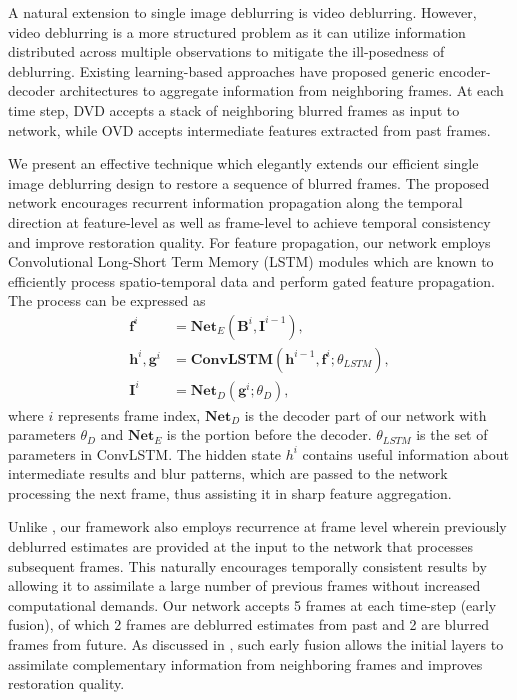 \documentclass[10pt,twocolumn,letterpaper]{article}
\begin{document}
A natural extension to single image deblurring is video deblurring. However, video deblurring is a more structured problem as it can utilize information distributed across multiple observations to mitigate the ill-posedness of deblurring. Existing learning-based approaches \cite{su2017deep,hyun2017online} have proposed generic encoder-decoder architectures to aggregate information from neighboring frames. At each time step, DVD \cite{su2017deep} accepts a stack of neighboring blurred frames as input to network, while OVD \cite{hyun2017online} accepts intermediate features extracted from past frames.
 
We present an effective technique which elegantly extends our efficient single image deblurring design to restore a sequence of blurred frames. The proposed network encourages recurrent information propagation along the temporal direction  at feature-level as well as frame-level to achieve temporal consistency and improve restoration quality. For feature propagation, our network employs Convolutional Long-Short Term Memory (LSTM) modules \cite{xingjian2015convolutional} which are known to efficiently process spatio-temporal data and perform gated feature propagation. The process can be expressed as
\begin{equation}
   \begin{aligned}
      \mathbf{f}^i &= \mathbf{Net}_{E}(\mathbf{B}^i,\mathbf{I}^{i-1}), \\
      \mathbf{h}^i,\mathbf{g}^i &= \mathbf{ConvLSTM}(\mathbf{h}^{i-1},\mathbf{f}^i; \theta_{LSTM}),\\
      \mathbf{I}^i &= \mathbf{Net}_{D}(\mathbf{g}^i; \theta_D),
   \end{aligned}\label{eq:edresblock}
\end{equation}
where $i$ represents frame index, $\mathbf{Net}_{D}$ is the decoder part of our network with parameters $\theta_D$ and $\mathbf{Net}_{E}$ is the portion before the decoder. $\theta_{LSTM}$ is the set of parameters in ConvLSTM. The hidden state $h^i$ contains useful information about intermediate results and blur patterns, which are passed to the network processing the next frame, thus assisting it in sharp feature aggregation.

 Unlike \cite{su2017deep,hyun2017online}, our framework also employs recurrence at frame level wherein previously deblurred estimates are provided at the input to the network that processes subsequent frames. This naturally encourages temporally consistent results by allowing it to assimilate a large number of previous frames without increased computational demands. Our network accepts 5 frames at each time-step (early fusion), of which 2 frames are deblurred estimates from past and 2 are blurred frames from future. As discussed in \cite{caballero2017real}, such early fusion allows the initial layers to assimilate complementary information from neighboring frames and improves restoration quality.
\end{document}
